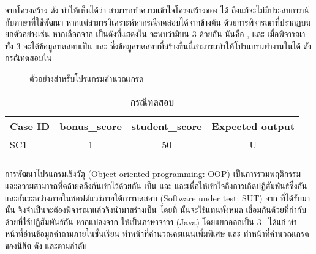 {{จากโครงสร้าง{\sourcecode} ดัง{} ทำให้เห็นได้ว่า {\tester}สามารถทำความเข้าใจโครงสร้างของ{\sourcecode} ได้ 
ถึงแม้{\tester}จะไม่มีประสบการณ์กับภาษาที่ใช้พัฒนา หากแต่{\tester}สามารวิเคราะห์หากรณีทดสอบได้จาก{\cfg}ข้างต้น 
ด้วยการพิจารณา{\PredicateNode}ที่ปรากฏบน{\FirstTimeDefine{\TestPath}{\TestPathEN}} ยกตัวอย่างเช่น 
หากเลือก{\Path}จาก{} เป็น{\TestPath}ดังที่แสดงใน{} จะพบว่ามี{\PredicateNode}บน{\TestPath} 3 {\Node} 
ด้วยกัน นั่นคือ ,  และ  เมื่อพิจารณา{\PredicateNode}ทั้ง 3 {\Node}จะได้ข้อมูลทดสอบเป็น  และ 
 ซึ่งข้อมูลทดสอบที่สร้างขึ้นนี้สามารถทำให้โปรแกรมทำงานใน{\TestPath}ได้ 
ดังกรณีทดสอบใน

\clearpage
\begin{figure}[ht!]
    \centering
    \caption{ตัวอย่าง{\TestPath}สำหรับโปรแกรมคำนวณเกรด}
    \label{fig:testpath}
\end{figure}


\begin{table}[ht!]
    \centering
    \caption{กรณีทดสอบ}
    \label{tab:simpleTestCase}
    \begin{tabular}{|l|c|c|c|}
    \hline
    \rowcolor{LightGray}
    Case ID     & bonus\_score  & student\_score    & Expected output \\
    \hline
    SC1         & 1             & 50                & U \\
    \hline
    \end{tabular}
\end{table}

\subsubsection{\FirstTimeDefine{\scg}{\scgEN}}

การพัฒนาโปรแกรมเชิงวัตุ (Object-oriented programming: OOP) เป็นการรวมพฤติกรรม และความสามารถที่คล้ายคลึงกันเข้าไว้ด้วยกัน \cite{kindler2011}
เป็น\FirstTimeDefine{\class}{\classEN} \FirstTimeDefine{\method}{\methodEN} และ \FirstTimeDefine{\attribute}{\attributeEN} 
และเพื่อให้เข้าใจถึงการเกิดปฏิสัมพันธ์ซึ่งกันและกันระหว่าง{\class}ภายในซอฟต์แวร์ภายใต้การทดสอบ (Software under test: SUT) จาก{\sourcecode} 
ที่ได้รับมานั้น จึงจำเป็นจะต้องพิจารณา{\sourcecode}แล้วจึงนำมาสร้างเป็น \FirstTimeDefine{\scg}{\scgEN} โดยที่{\scg} 
นั้นจะใช้{\Node}แทน{\class}ทั้งหมด เชื่อมกันด้วย{\Edge}ที่กำกับด้วย{\method}ที่{\class}ใช้ปฏิสัมพันธ์กัน หากแปลง{\sourcecode}จาก
 ให้เป็น{\sourcecode}ภาษาจาวา (Java) โดยแยกออกเป็น 3 \class\ ได้แก่  
ทำหน้าที่อ่านข้อมูลคำถามภายในชั้นเรียน  ทำหน้าที่คำนวณคะแนนเพิ่มพิเศษ และ  ทำหน้าที่คำนวณเกรดของนิสิต 
ดัง   และตามลำดับ

}}
